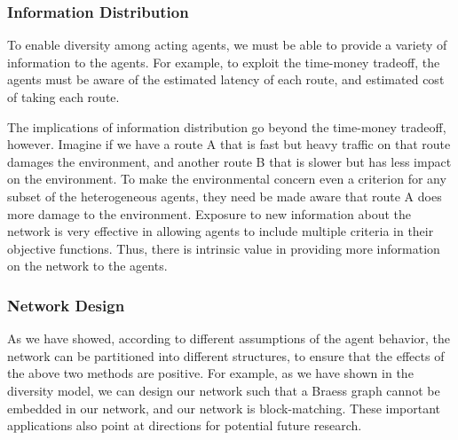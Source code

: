 \subsubsection{Information Distribution}
To enable diversity among acting agents, we must be able to provide a variety of information to the agents. For example, to exploit the time-money tradeoff, the agents must be aware of the estimated latency of each route, and estimated cost of taking each route. 

The implications of information distribution go beyond the time-money tradeoff, however. Imagine if we have a route A that is fast but heavy traffic on that route damages the environment, and another route B that is slower but has less impact on the environment. To make the environmental concern even a criterion for any subset of the heterogeneous agents, they need be made aware that route A does more damage to the environment. Exposure to new information about the network is very effective in allowing agents to include multiple criteria in their objective functions. Thus, there is intrinsic value in providing more information on the network to the agents.

\subsubsection{Network Design}

As we have showed, according to different assumptions of the agent behavior, the network can be partitioned into different structures, to ensure that the effects of the above two methods are positive. For example, as we have shown in the diversity model, we can design our network such that a Braess graph cannot be embedded in our network, and our network is block-matching.
These important applications also point at directions for potential future research. 

